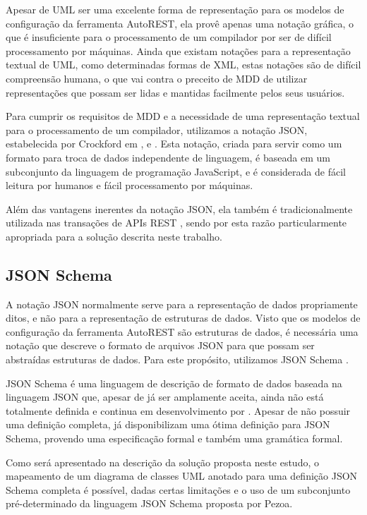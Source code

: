 Apesar de UML ser uma excelente forma de representação para os modelos de configuração da ferramenta AutoREST, ela provê apenas uma notação gráfica, o que é insuficiente para o processamento de um compilador por ser de difícil processamento por máquinas. Ainda que existam notações para a representação textual de UML, como determinadas formas de XML, estas notações são de difícil compreensão humana, o que vai contra o preceito de MDD de utilizar representações que possam ser lidas e mantidas facilmente pelos seus usuários.

Para cumprir os requisitos de MDD e a necessidade de uma representação textual para o processamento de um compilador, utilizamos a notação JSON, estabelecida por Crockford em \cite{JSON:2016}, \cite{RFC4627} e \cite{ECMA404}. Esta notação, criada para servir como um formato para troca de dados independente de linguagem, é baseada em um subconjunto da linguagem de programação JavaScript, e é considerada de fácil leitura por humanos e fácil processamento por máquinas.

Além das vantagens inerentes da notação JSON, ela também é tradicionalmente utilizada nas transações de APIs REST \cite{PEZOA:2016} \cite{POLAK:2015}, sendo por esta razão particularmente apropriada para a solução descrita neste trabalho.


\subsection{JSON Schema}

A notação JSON normalmente serve para a representação de dados propriamente ditos, e não para a representação de estruturas de dados. Visto que os modelos de configuração da ferramenta AutoREST são estruturas de dados, é necessária uma notação que descreve o formato de arquivos JSON para que possam ser abstraídas estruturas de dados. Para este propósito, utilizamos JSON Schema \cite{GALIEGUE:2013}.

JSON Schema é uma linguagem de descrição de formato de dados baseada na linguagem JSON que, apesar de já ser amplamente aceita, ainda não está totalmente definida e continua em desenvolvimento por . Apesar de não possuir uma definição completa,  já disponibilizam uma ótima definição para JSON Schema, provendo uma especificação formal e também uma gramática formal.

Como será apresentado na descrição da solução proposta neste estudo, o mapeamento de um diagrama de classes UML anotado para uma definição JSON Schema completa é possível, dadas certas limitações e o uso de um subconjunto pré-determinado da linguagem JSON Schema proposta por Pezoa.